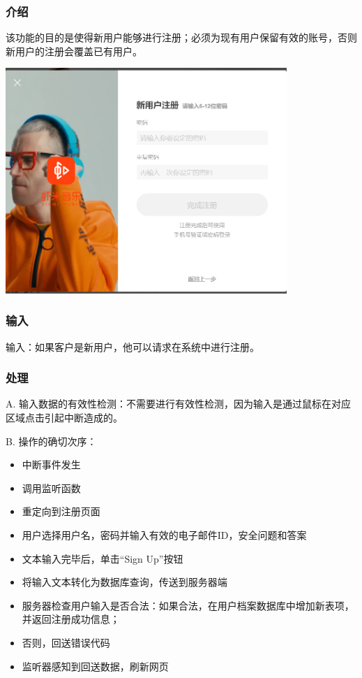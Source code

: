 		 \subsubsection{介绍}
		 该功能的目的是使得新用户能够进行注册；必须为现有用户保留有效的账号，否则新用户的注册会覆盖已有用户。
		 \begin{center} 
			\includegraphics[width=0.8\textwidth]{./figures/capture11.png} 
			\end{center}
		 \subsubsection{输入}
		 
		 输入：如果客户是新用户，他可以请求在系统中进行注册。
		 
		 \subsubsection{处理}
		 
		 
		 
		 A. 输入数据的有效性检测：不需要进行有效性检测，因为输入是通过鼠标在对应区域点击引起中断造成的。
		 
		 B. 操作的确切次序：
		 \begin{adjustwidth}{2cm}{1cm}\qquad
			 \begin{itemize}
				 \item 中断事件发生
				 \item 调用监听函数
				 \item 重定向到注册页面
				 \item 用户选择用户名，密码并输入有效的电子邮件ID，安全问题和答案
				 \item 文本输入完毕后，单击“Sign Up”按钮
				 \item 将输入文本转化为数据库查询，传送到服务器端
				 \item 服务器检查用户输入是否合法：如果合法，在用户档案数据库中增加新表项，并返回注册成功信息；
				 \item 否则，回送错误代码
				 \item 监听器感知到回送数据，刷新网页
			 \end{itemize}		
		 \end{adjustwidth}
		  
